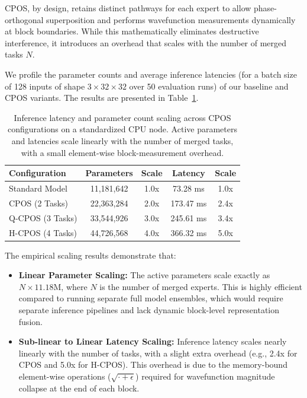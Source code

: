 \documentclass{article}
\theoremstyle{plain}
\theoremstyle{definition}
\theoremstyle{remark}
\begin{document}
CPOS, by design, retains distinct pathways for each expert to allow phase-orthogonal superposition and performs wavefunction measurements dynamically at block boundaries. While this mathematically eliminates destructive interference, it introduces an overhead that scales with the number of merged tasks $N$.

We profile the parameter counts and average inference latencies (for a batch size of 128 inputs of shape $3 \times 32 \times 32$ over 50 evaluation runs) of our baseline and CPOS variants. The results are presented in Table~\ref{tab:benchmarks}.

\begin{table}[h]
\caption{Inference latency and parameter count scaling across CPOS configurations on a standardized CPU node. Active parameters and latencies scale linearly with the number of merged tasks, with a small element-wise block-measurement overhead.}
\label{tab:benchmarks}
\begin{center}
\begin{small}
\begin{sc}
\begin{tabular}{lcccc}
\toprule
Configuration & Parameters & Scale & Latency & Scale \\
\midrule
Standard Model & 11,181,642 & 1.0x & 73.28 ms & 1.0x \\
CPOS (2 Tasks) & 22,363,284 & 2.0x & 173.47 ms & 2.4x \\
Q-CPOS (3 Tasks) & 33,544,926 & 3.0x & 245.61 ms & 3.4x \\
H-CPOS (4 Tasks) & 44,726,568 & 4.0x & 366.32 ms & 5.0x \\
\bottomrule
\end{tabular}
\end{sc}
\end{small}
\end{center}
\end{table}

The empirical scaling results demonstrate that:
\begin{itemize}
\item \textbf{Linear Parameter Scaling:} The active parameters scale exactly as $N \times 11.18$M, where $N$ is the number of merged experts. This is highly efficient compared to running separate full model ensembles, which would require separate inference pipelines and lack dynamic block-level representation fusion.
\item \textbf{Sub-linear to Linear Latency Scaling:} Inference latency scales nearly linearly with the number of tasks, with a slight extra overhead (e.g., 2.4x for CPOS and 5.0x for H-CPOS). This overhead is due to the memory-bound element-wise operations ($\sqrt{\cdot + \epsilon}$) required for wavefunction magnitude collapse at the end of each block.
\end{itemize}
\end{document}
